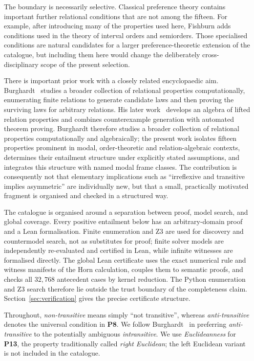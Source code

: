 \documentclass[11pt,a4paper,reqno]{amsart}
\theoremstyle{definition}
\theoremstyle{remark}
\newcommand{\prop}[1]{\textbf{P#1}}
\begin{document}
The boundary is necessarily selective.  Classical preference theory contains
important further relational conditions that are not among the fifteen.  For
example, after introducing many of the properties used here, Fishburn
\cite[Sec.~2.4]{Fishburn1970} adds conditions used in the theory of interval
orders and semiorders.  Those specialised conditions are natural candidates
for a larger preference-theoretic extension of the catalogue, but including
them here would change the deliberately cross-disciplinary scope of the
present selection.

There is important prior work with a closely related encyclopaedic aim.
Burghardt~\cite{Burghardt2018} studies a broader collection of relational
properties computationally, enumerating finite relations to generate candidate
laws and then proving the surviving laws for arbitrary relations.  His later
work~\cite{Burghardt2021} develops an algebra of lifted relation properties and
combines counterexample generation with automated theorem proving.  Burghardt
therefore studies a broader collection of relational properties computationally
and algebraically; the present work isolates fifteen properties prominent in
modal, order-theoretic and relation-algebraic contexts, determines their
entailment structure under explicitly stated assumptions, and integrates this
structure with named modal frame classes.  The contribution is consequently
not that elementary implications such as ``irreflexive and transitive implies
asymmetric'' are individually new, but that a small, practically motivated
fragment is organised and checked in a structured way.

The catalogue is organised around a separation between proof, model search,
and global coverage.  Every positive entailment below has an arbitrary-domain
proof and a Lean formalisation.  Finite enumeration and Z3 are used for
discovery and countermodel search, not as substitutes for proof; finite solver
models are independently re-evaluated and certified in Lean, while infinite
witnesses are formalised directly.  The global Lean certificate uses the exact
numerical rule and witness manifests of the Horn calculation, couples them to
semantic proofs, and checks all $32{,}768$ antecedent cases by kernel
reduction.  The Python enumeration and Z3 search therefore lie outside the
trust boundary of the completeness claim.  Section~\ref{sec:verification}
gives the precise certificate structure.

Throughout, \emph{non-transitive} means simply ``not transitive'', whereas
\emph{anti-transitive} denotes the universal condition in \prop{8}.  We follow
Burghardt~\cite{Burghardt2018} in preferring \emph{anti-transitive} to the
potentially ambiguous \emph{intransitive}.  We use \emph{Euclideanness} for \prop{13}, the property traditionally
called \emph{right Euclidean}; the left Euclidean variant is not included in the
catalogue.
\end{document}
